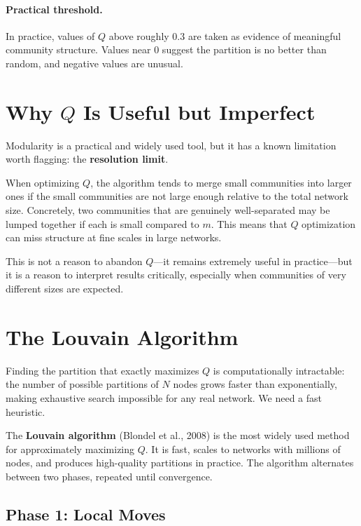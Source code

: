 \documentclass[11pt]{article}
\theoremstyle{definition}
\begin{document}
\paragraph{Practical threshold.} In practice, values of $Q$ above roughly 0.3 are taken as evidence of meaningful community structure. Values near 0 suggest the partition is no better than random, and negative values are unusual.

\section{Why $Q$ Is Useful but Imperfect}

Modularity is a practical and widely used tool, but it has a known limitation worth flagging: the \textbf{resolution limit}.

When optimizing $Q$, the algorithm tends to merge small communities into larger ones if the small communities are not large enough relative to the total network size. Concretely, two communities that are genuinely well-separated may be lumped together if each is small compared to $m$. This means that $Q$ optimization can miss structure at fine scales in large networks.

This is not a reason to abandon $Q$---it remains extremely useful in practice---but it is a reason to interpret results critically, especially when communities of very different sizes are expected.

\section{The Louvain Algorithm}

Finding the partition that exactly maximizes $Q$ is computationally intractable: the number of possible partitions of $N$ nodes grows faster than exponentially, making exhaustive search impossible for any real network. We need a fast heuristic.

The \textbf{Louvain algorithm} (Blondel et al., 2008) is the most widely used method for approximately maximizing $Q$. It is fast, scales to networks with millions of nodes, and produces high-quality partitions in practice. The algorithm alternates between two phases, repeated until convergence.

\subsection{Phase 1: Local Moves}
\end{document}
